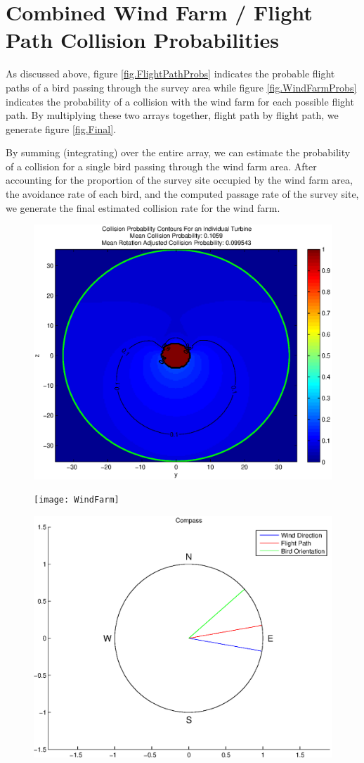 \documentclass[11pt,letterpaper,openany]{report}
\begin{document}
\section{Combined Wind Farm / Flight Path Collision Probabilities}
As discussed above, figure \ref{fig.FlightPathProbs} indicates the probable flight paths of a bird passing through the
survey area while figure \ref{fig.WindFarmProbs} indicates the probability of a collision with the wind farm for each
possible flight path. By multiplying these two arrays together, flight path by flight path, we generate figure
\ref{fig.Final}.

By summing (integrating) over the entire array, we can estimate the probability of a collision for a single bird
passing through the wind farm area. After accounting for the proportion of the survey site occupied by the wind farm
area, the avoidance rate of each bird, and the computed passage rate of the survey site, we generate the final
estimated collision rate for the wind farm.

\begin{figure}
   \centering
   \includegraphics[width=0.75\columnwidth]{Turbine}
   \caption{}
   \label{fig.Turbine}
\end{figure}

\begin{figure}
   \centering
   \texttt{[image: WindFarm]}
   \caption{}
   \label{fig.WindFarm}
\end{figure}

\begin{figure}
   \centering
   \includegraphics[width=0.5\columnwidth]{Directions}
   \caption{}
   \label{fig.Directions}
\end{figure}
\end{document}
